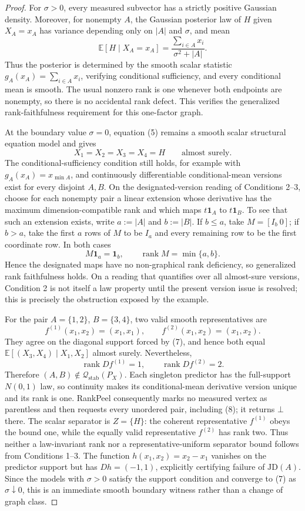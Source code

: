 \documentclass{article}
\begin{document}
\begin{proof}
For \(\sigma>0\), every measured subvector has a strictly positive Gaussian density.  Moreover, for nonempty \(A\), the Gaussian posterior law of \(H\) given \(X_A=x_A\) has variance depending only on \(|A|\) and \(\sigma\), and mean
\[
 \mathbb E[H\mid X_A=x_A]
 =\frac{\sum_{i\in A}x_i}{\sigma^2+|A|}. \tag{6}
\]
Thus the posterior is determined by the smooth scalar statistic \(g_A(x_A)=\sum_{i\in A}x_i\), verifying conditional sufficiency, and every conditional mean is smooth.  The usual nonzero rank is one whenever both endpoints are nonempty, so there is no accidental rank defect.  This verifies the generalized rank-faithfulness requirement for this one-factor graph.

At the boundary value \(\sigma=0\), equation (5) remains a smooth scalar structural equation model and gives
\[
 X_1=X_2=X_3=X_4=H\qquad\text{almost surely}. \tag{7}
\]
The conditional-sufficiency condition still holds, for example with \(g_A(x_A)=x_{\min A}\), and continuously differentiable conditional-mean versions exist for every disjoint \(A,B\).  On the designated-version reading of Conditions 2--3, choose for each nonempty pair a linear extension whose derivative has the maximum dimension-compatible rank and which maps \(t\mathbf 1_A\) to \(t\mathbf 1_B\).  To see that such an extension exists, write \(a:=|A|\) and \(b:=|B|\).  If \(b\leq a\), take \(M=[I_b\ 0]\); if \(b>a\), take the first \(a\) rows of \(M\) to be \(I_a\) and every remaining row to be the first coordinate row.  In both cases
\[
 M\mathbf 1_a=\mathbf 1_b,
 \qquad
 \operatorname{rank}M=\min\{a,b\}. \tag{7a}
\]
Hence the designated maps have no non-graphical rank deficiency, so generalized rank faithfulness holds.  On a reading that quantifies over all almost-sure versions, Condition 2 is not itself a law property until the present version issue is resolved; this is precisely the obstruction exposed by the example.

For the pair \(A=\{1,2\}\), \(B=\{3,4\}\), two valid smooth representatives are
\[
 f^{(1)}(x_1,x_2)=(x_1,x_1),
 \qquad
 f^{(2)}(x_1,x_2)=(x_1,x_2). \tag{8}
\]
They agree on the diagonal support forced by (7), and hence both equal \(\mathbb E[(X_3,X_4)\mid X_1,X_2]\) almost surely.  Nevertheless,
\[
 \operatorname{rank}Df^{(1)}=1,
 \qquad
 \operatorname{rank}Df^{(2)}=2. \tag{9}
\]
Therefore \((A,B)\notin\mathcal Q_{\mathrm{stab}}(P_X)\).  Each singleton predictor has the full-support \(N(0,1)\) law, so continuity makes its conditional-mean derivative version unique and its rank is one.  RankPeel consequently marks no measured vertex as parentless and then requests every unordered pair, including (8); it returns \(\bot\) there.  The scalar separator is \(Z=\{H\}\): the coherent representative \(f^{(1)}\) obeys the bound one, while the equally valid representative \(f^{(2)}\) has rank two.  Thus neither a law-invariant rank nor a representative-uniform separator bound follows from Conditions 1--3.  The function \(h(x_1,x_2)=x_2-x_1\) vanishes on the predictor support but has \(Dh=(-1,1)\), explicitly certifying failure of \(\mathrm{JD}(A)\).  Since the models with \(\sigma>0\) satisfy the support condition and converge to (7) as \(\sigma\downarrow0\), this is an immediate smooth boundary witness rather than a change of graph class.


\end{proof}
\end{document}
